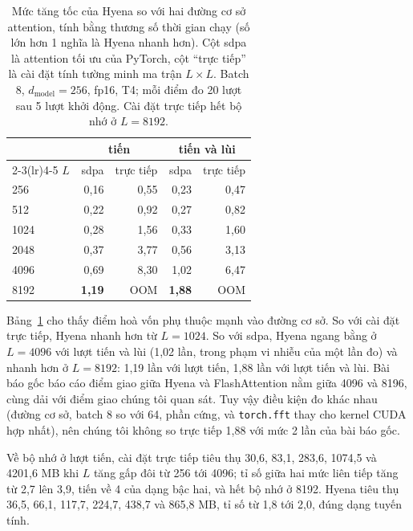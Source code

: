 \documentclass[11pt]{article}
\begin{document}
\begin{table}[t]
\centering
\small
\begin{tabular}{lrrrr}
\toprule
& \multicolumn{2}{c}{tiến} & \multicolumn{2}{c}{tiến và lùi} \\
\cmidrule(lr){2-3}\cmidrule(lr){4-5}
$L$ & \textsf{sdpa} & trực tiếp & \textsf{sdpa} & trực tiếp \\
\midrule
256  & 0,16 & 0,55 & 0,23 & 0,47 \\
512  & 0,22 & 0,92 & 0,27 & 0,82 \\
1024 & 0,28 & 1,56 & 0,33 & 1,60 \\
2048 & 0,37 & 3,77 & 0,56 & 3,13 \\
4096 & 0,69 & 8,30 & 1,02 & 6,47 \\
8192 & \textbf{1,19} & OOM & \textbf{1,88} & OOM \\
\bottomrule
\end{tabular}
\caption{Mức tăng tốc của Hyena so với hai đường cơ sở attention, tính bằng
thương số thời gian chạy (số lớn hơn 1 nghĩa là Hyena nhanh hơn). Cột
\textsf{sdpa} là attention tối ưu của PyTorch, cột ``trực tiếp'' là cài đặt
tính tường minh ma trận $L \times L$. Batch 8, $d_{\text{model}} = 256$, fp16, T4;
mỗi điểm đo 20 lượt sau 5 lượt khởi động. Cài đặt trực tiếp hết bộ nhớ ở
$L = 8192$.}
\label{tab:e5}
\end{table}

Bảng~\ref{tab:e5} cho thấy điểm hoà vốn phụ thuộc mạnh vào đường cơ sở. So với
cài đặt trực tiếp, Hyena nhanh hơn từ $L = 1024$. So với \textsf{sdpa}, Hyena
ngang bằng ở $L = 4096$ với lượt tiến và lùi (1,02 lần, trong phạm vi nhiễu của
một lần đo) và nhanh hơn ở $L = 8192$: 1,19 lần với lượt tiến, 1,88 lần với lượt
tiến và lùi. Bài báo gốc báo cáo điểm giao giữa Hyena và FlashAttention nằm giữa
4096 và 8196, cùng dải với điểm giao chúng tôi quan sát. Tuy vậy điều kiện đo
khác nhau (đường cơ sở, batch 8 so với 64, phần cứng, và \texttt{torch.fft} thay
cho kernel CUDA hợp nhất), nên chúng tôi không so trực tiếp 1,88 với mức 2 lần
của bài báo gốc.

Về bộ nhớ ở lượt tiến, cài đặt trực tiếp tiêu thụ 30,6, 83,1, 283,6, 1074,5 và
4201,6 MB khi $L$ tăng gấp đôi từ 256 tới 4096; tỉ số giữa hai mức liên tiếp
tăng từ 2,7 lên 3,9, tiến về 4 của dạng bậc hai, và hết bộ nhớ ở 8192. Hyena
tiêu thụ 36,5, 66,1, 117,7, 224,7, 438,7 và 865,8 MB, tỉ số từ 1,8 tới 2,0, đúng
dạng tuyến tính.
\end{document}
